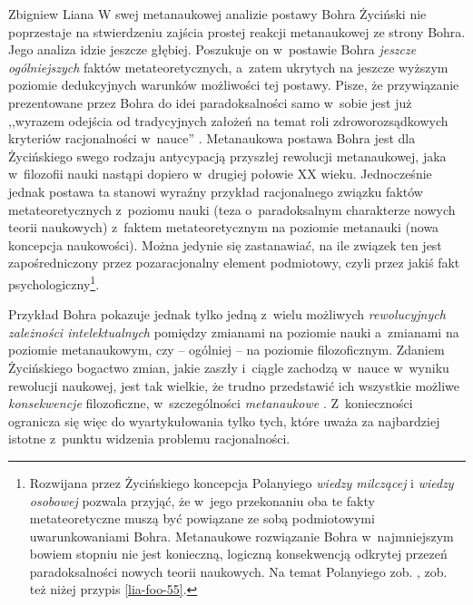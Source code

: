 \begin{artplenv}{Zbigniew Liana}
W swej metanaukowej analizie postawy Bohra Życiński nie poprzestaje na stwierdzeniu zajścia prostej reakcji metanaukowej
ze strony Bohra. Jego analiza idzie jeszcze głębiej. Poszukuje on w~postawie Bohra \textit{jeszcze} \textit{ogólniejszych
}faktów metateoretycznych, a~zatem ukrytych na jeszcze wyższym poziomie dedukcyjnych warunków możliwości tej postawy.
Pisze, że przywiązanie prezentowane przez Bohra do idei paradoksalności samo w~sobie jest już ,,wyrazem odejścia od
tradycyjnych założeń na temat roli zdroworozsądkowych kryteriów racjonalności w~nauce''
\parencites[s.~9]{zycinski_structure_1988}[s.~16]{zycinski_struktura_2013}.
Metanaukowa postawa Bohra jest dla Życińskiego swego rodzaju antycypacją przyszłej
rewolucji metanaukowej, jaka w~filozofii nauki nastąpi dopiero w~drugiej połowie XX wieku. Jednocześnie jednak postawa
ta stanowi wyraźny przykład racjonalnego związku faktów metateoretycznych z~poziomu nauki (teza o~paradoksalnym
charakterze nowych teorii naukowych) z~faktem metateoretycznym na poziomie metanauki (nowa koncepcja naukowości). Można
jedynie się zastanawiać, na ile związek ten jest zapośredniczony przez pozaracjonalny element podmiotowy, czyli przez
jakiś fakt psychologiczny\footnote{\label{lia-foo-26}Rozwijana przez Życińskiego koncepcja Polanyiego \textit{wiedzy milczącej} i
\textit{wiedzy osobowej }pozwala przyjąć, że w~jego przekonaniu oba te fakty metateoretyczne muszą być powiązane ze sobą
podmiotowymi uwarunkowaniami Bohra. Metanaukowe rozwiązanie Bohra w~najmniejszym bowiem stopniu nie jest konieczną,
logiczną konsekwencją odkrytej przezeń paradoksalności nowych teorii naukowych. Na temat Polanyiego zob.
\parencites[s.~169n]{zycinski_jezyk_1983}[s.~156–166]{zycinski_teizm_1985}[s.~144.202]{zycinski_structure_1988}%
[s.~218.351]{zycinski_struktura_2013}[s.~179–191]{zycinski_elementy_2015},
zob. też niżej przypis \ref{lia-foo-55}.}.

\enlargethispage{1\baselineskip}
Przykład Bohra pokazuje jednak tylko jedną z~wielu możliwych \textit{rewolucyjnych zależności intelektualnych} pomiędzy
zmianami na poziomie nauki a~zmianami na poziomie metanaukowym, czy -- ogólniej -- na poziomie filozoficznym. Zdaniem
Życińskiego bogactwo zmian, jakie zaszły i~ciągle zachodzą w~nauce w~wyniku rewolucji naukowej, jest tak wielkie, że
trudno przedstawić ich wszystkie możliwe \textit{konsekwencje} filozoficzne, w~szczególności \textit{metanaukowe}
\parencites[s.~8]{zycinski_structure_1988}[s.~15]{zycinski_struktura_2013}.
Z~konieczności ogranicza się więc do
wyartykułowania tylko tych, które uważa za najbardziej istotne z~punktu widzenia problemu racjonalności.


\end{artplenv}
